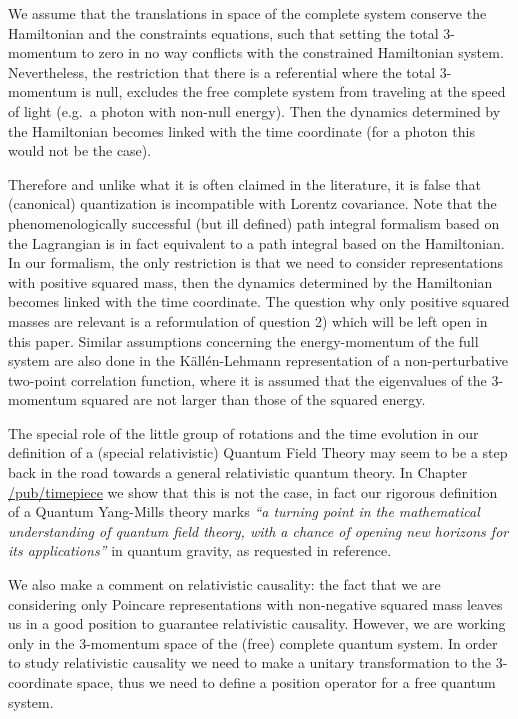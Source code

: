 \documentclass[11pt]{book}
\begin{document}
We assume that the translations in space of the complete system conserve
the Hamiltonian and the constraints equations, such that setting the
total 3-momentum to zero in no way conflicts with the constrained
Hamiltonian system. Nevertheless, the restriction that there is a
referential where the total 3-momentum is null, excludes the free
complete system from traveling at the speed of light (e.g.~a photon with
non-null energy). Then the dynamics determined by the Hamiltonian
becomes linked with the time coordinate (for a photon this would not be
the case\cite{Dirac1949Forms}).

Therefore and unlike what it is often claimed in the literature, it is
false that (canonical) quantization is incompatible with Lorentz
covariance. Note that the phenomenologically successful (but ill
defined) path integral formalism based on the Lagrangian is in fact
equivalent to a path integral based on the
Hamiltonian\cite{Grosse1993Equivalence}. In our formalism, the only restriction is that we need
to consider representations with positive squared mass, then the
dynamics determined by the Hamiltonian becomes linked with the time
coordinate\cite{Dirac1949Forms}. The
question why only positive squared masses are relevant is a
reformulation of question 2) which will be left open in this paper.
Similar assumptions concerning the energy-momentum of the full system
are also done in the Källén-Lehmann representation of a non-perturbative
two-point correlation function, where it is assumed that the eigenvalues
of the 3-momentum squared are not larger than those of the squared
energy\cite{Itzykson1980Quantum}.

The special role of the little group of rotations and the time evolution
in our definition of a (special relativistic) Quantum Field Theory may
seem to be a step back in the road towards a general relativistic
quantum theory. In Chapter
\href{https://timepiece.pubpub.org/pub/timepiece}{/pub/timepiece} we
show that this is not the case, in fact our rigorous definition of a
Quantum Yang-Mills theory marks \emph{``a turning point in the
mathematical understanding of quantum field theory, with a chance of
opening new horizons for its applications''} in quantum gravity, as
requested in reference\cite{Jaffe2006Quantum}.

We also make a comment on relativistic causality: the fact that we are
considering only Poincare representations with non-negative squared mass
leaves us in a good position to guarantee relativistic causality.
However, we are working only in the 3-momentum space of the (free)
complete quantum system. In order to study relativistic causality we
need to make a unitary transformation to the 3-coordinate space, thus we
need to define a position operator for a free quantum system.
\end{document}
